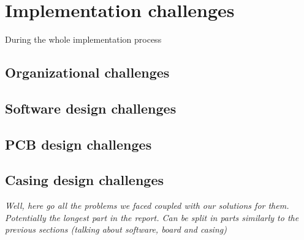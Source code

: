 \section{Implementation challenges}
During the whole implementation process 
\subsection{Organizational challenges}

\subsection{Software design challenges}
\subsection{PCB design challenges}
\subsection{Casing design challenges}

\textit{Well, here go all the problems we faced coupled with our solutions for them. Potentially the longest part in the report. Can be split in parts similarly to the previous sections (talking about software, board and casing)}

